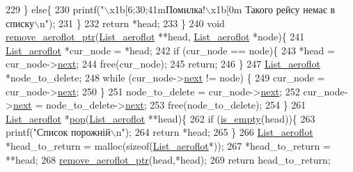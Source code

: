 \begin{DoxyCodeInclude}
{229     \} \textcolor{keywordflow}{else}\{
230         printf(\textcolor{stringliteral}{"\(\backslash\)x1b[6;30;41mПомилка!\(\backslash\)x1b[0m  Такого рейсу немає в списку\(\backslash\)n"});
231     \}
232     \textcolor{keywordflow}{return} *head;
233 \}
240 \textcolor{keywordtype}{void} \hyperlink{main_8c_a81b22e06ebb21b94865712c93f535f12}{remove\_aeroflot\_ptr}(\hyperlink{structsingle__linked__list__aeroflot__struct}{List\_aeroflot} **head, 
      \hyperlink{structsingle__linked__list__aeroflot__struct}{List\_aeroflot} *node)\{
241     \hyperlink{structsingle__linked__list__aeroflot__struct}{List\_aeroflot} *cur\_node = *head;
242     \textcolor{keywordflow}{if} (cur\_node == node)\{
243         *head = cur\_node->\hyperlink{structsingle__linked__list__aeroflot__struct_a8aed81380fcda3f4230250e126b28d5e}{next};
244         free(cur\_node);
245         \textcolor{keywordflow}{return};
246     \}
247     \hyperlink{structsingle__linked__list__aeroflot__struct}{List\_aeroflot} *node\_to\_delete;
248     \textcolor{keywordflow}{while} (cur\_node->\hyperlink{structsingle__linked__list__aeroflot__struct_a8aed81380fcda3f4230250e126b28d5e}{next} != node) \{
249         cur\_node = cur\_node->\hyperlink{structsingle__linked__list__aeroflot__struct_a8aed81380fcda3f4230250e126b28d5e}{next};
250     \}
251     node\_to\_delete = cur\_node->\hyperlink{structsingle__linked__list__aeroflot__struct_a8aed81380fcda3f4230250e126b28d5e}{next};
252     cur\_node->\hyperlink{structsingle__linked__list__aeroflot__struct_a8aed81380fcda3f4230250e126b28d5e}{next} = node\_to\_delete->\hyperlink{structsingle__linked__list__aeroflot__struct_a8aed81380fcda3f4230250e126b28d5e}{next};
253     free(node\_to\_delete);
254 \}
261 \hyperlink{structsingle__linked__list__aeroflot__struct}{List\_aeroflot} *\hyperlink{main_8c_a7e397112c557e808e91ddfdb85d3323c}{pop}(\hyperlink{structsingle__linked__list__aeroflot__struct}{List\_aeroflot} **head)\{
262     \textcolor{keywordflow}{if} (\hyperlink{main_8c_a4d48471ab7b12b187d04943f4d808488}{is\_empty}(head))\{
263         printf(\textcolor{stringliteral}{"Список порожній\(\backslash\)n"});
264         \textcolor{keywordflow}{return} *head;
265     \}
266     \hyperlink{structsingle__linked__list__aeroflot__struct}{List\_aeroflot} *head\_to\_return = malloc(\textcolor{keyword}{sizeof}(\hyperlink{structsingle__linked__list__aeroflot__struct}{List\_aeroflot}*));
267     *head\_to\_return = **head;
268     \hyperlink{main_8c_a81b22e06ebb21b94865712c93f535f12}{remove\_aeroflot\_ptr}(head,*head);
269     \textcolor{keywordflow}{return} head\_to\_return;
}
\end{DoxyCodeInclude}
